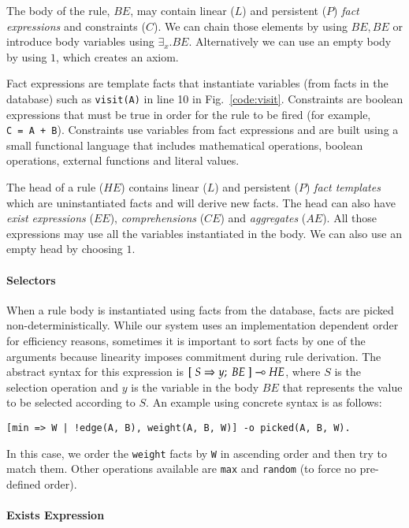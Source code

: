 The body of the rule, $BE$, may contain linear ($L$) and persistent ($P$) \emph{fact expressions} and
constraints ($C$). We can chain those elements by using $BE, BE$ or introduce body variables using $\exists_{x}. BE$.
Alternatively we can use an empty body by using $1$, which creates an axiom.

Fact expressions are template facts that instantiate variables
(from facts in the database) such as \texttt{visit(A)} in line 10 in Fig.~\ref{code:visit}.
Constraints are boolean expressions that must
be true in order for the rule to be fired (for example, \texttt{C~=~A~+~B}). Constraints use variables from fact expressions and are built using a small functional language that includes mathematical operations, boolean operations, external functions and literal values.

The head of a rule ($HE$) contains linear ($L$) and persistent ($P$) \emph{fact templates} which are uninstantiated facts and will derive new facts. The head can also have \emph{exist expressions} ($EE$), \emph{comprehensions} ($CE$) and \emph{aggregates} ($AE$). All those expressions
may use all the variables instantiated in the body. We can also use an empty head by choosing $1$.

\paragraph{Selectors}

When a rule body is instantiated using facts from the database, facts are picked
non-deterministically. While our system uses an implementation dependent order for
efficiency reasons, sometimes it is important to sort facts by one of the arguments
because linearity imposes commitment during rule derivation. The abstract syntax for
this expression is $[\; S \Rightarrow y; \; BE \;] \multimap HE$, where $S$ is the selection operation and $y$ is the
variable in the body $BE$ that represents the value to be selected according to $S$.
An example using concrete syntax is as follows:

{\footnotesize
\begin{Verbatim}
[min => W | !edge(A, B), weight(A, B, W)] -o picked(A, B, W).
\end{Verbatim}
}

In this case, we order the \texttt{weight} facts by \texttt{W} in ascending order and then try
to match them. Other operations available are \texttt{max} and \texttt{random} (to force no pre-defined order).

\paragraph{Exists Expression}

